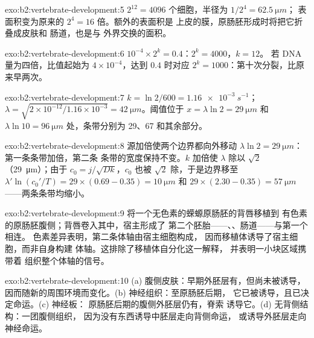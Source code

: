 \begin{solution}{exo:b2:vertebrate-development:5}
$2^{12} = 4096$ 个细胞，半径为 $1/2^{4} = \qty{62.5}{\micro m}$；
表面积变为原来的 $2^{4} = 16$ 倍。额外的表面积是
上皮的膜，原肠胚形成时将把它折叠成皮肤和
肠道，也是与
外界交换的面积。
\end{solution}

\begin{solution}{exo:b2:vertebrate-development:6}
$10^{-4}\times 2^{k} = 0.4$：$2^{k} = 4000$，$k = 12$。
若 DNA 量为四倍，比值起始为 $4\times 10^{-4}$，达到 $0.4$
时对应 $2^{k} = 1000$：第十次分裂，比原来早两次。
\end{solution}

\begin{solution}{exo:b2:vertebrate-development:7}
$k = \ln 2/600 = \qty{1.16e-3}{s^{-1}}$；$\lambda = \sqrt{2\times
10^{-12}/1.16\times 10^{-3}} = \qty{42}{\micro m}$。阈值位于
$x = \lambda\ln 2 = \qty{29}{\micro m}$ 和 $\lambda\ln 10 =
\qty{96}{\micro m}$ 处，条带分别为 29、67 和其余部分。
\end{solution}

\begin{solution}{exo:b2:vertebrate-development:8}
源加倍使两个边界都向外移动 $\lambda\ln
2 = \qty{29}{\micro m}$：第一条条带加倍，第二条
条带的宽度保持不变。$k$ 加倍使 $\lambda$ 除以 $\sqrt 2$
（\qty{29}{\micro m}）；由于 $c_0 = j/\sqrt{Dk}$，$c_0$ 也被
$\sqrt 2$ 除，于是边界移至 $\lambda'\ln(c_0'/T) =
29\times(0.69 - 0.35) = \qty{10}{\micro m}$ 和 $29\times(2.30 -
0.35) = \qty{57}{\micro m}$——两条条带均缩小。
\end{solution}

\begin{solution}{exo:b2:vertebrate-development:9}
将一个无色素的蝾螈原肠胚的背唇移植到
有色素的原肠胚腹侧；背唇卷入其中，宿主形成了
第二个胚胎——、、肠道——与第一个相连。
色素差异表明，第二条体轴由宿主细胞构成，
因而移植体诱导了宿主细胞，而非自身构建
体轴。这排除了移植体自分化这一解释，
并表明一小块区域携带着
组织整个体轴的信号。
\end{solution}

\begin{solution}{exo:b2:vertebrate-development:10}
(a) 腹侧皮肤：早期外胚层有，但尚未被诱导，
因而随新的周围环境而变化。(b) 神经组织：至原肠胚后期，
它已被诱导，且已决定命运。(c) 神经板：
原肠胚后期的腹侧外胚层仍有，脊索
诱导它。(d) 无背侧结构：一团腹侧组织，
因为没有东西诱导中胚层走向背侧命运，
或诱导外胚层走向神经命运。
\end{solution}

